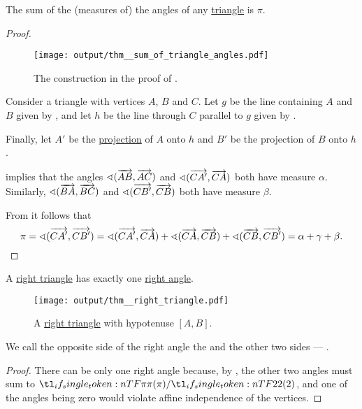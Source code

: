 \begin{proposition}\label{thm:sum_of_triangle_angles}
  The sum of the (measures of) the angles of any \hyperref[def:triangle]{triangle} is \( \pi \).
\end{proposition}
\begin{proof}
  \begin{figure}[!ht]
    \centering
    \texttt{[image: output/thm\_\_sum\_of\_triangle\_angles.pdf]}
    \caption{The construction in the proof of .}\label{fig:thm:sum_of_triangle_angles}
  \end{figure}

  Consider a triangle with vertices \( A \), \( B \) and \( C \). Let \( g \) be the line containing \( A \) and \( B \) given by , and let \( h \) be the line through \( C \) parallel to \( g \) given by .

  Finally, let \( A' \) be the \hyperref[def:rigid_motion/projection]{projection} of \( A \) onto \( h \) and \( B' \) be the projection of \( B \) onto \( h \).

   implies that the angles \( \sphericalangle(\overrightarrow{AB}, \overrightarrow{AC}) \) and \( \sphericalangle(\overrightarrow{CA'}, \overrightarrow{CA}) \) both have measure \( \alpha \). Similarly, \( \sphericalangle(\overrightarrow{BA}, \overrightarrow{BC}) \) and \( \sphericalangle(\overrightarrow{CB'}, \overrightarrow{CB}) \) both have measure \( \beta \).

  From  it follows that
  \begin{equation*}
    \pi
    =
    \sphericalangle(\overrightarrow{CA'}, \overrightarrow{CB'})
    =
    \sphericalangle(\overrightarrow{CA'}, \overrightarrow{CA}) + \sphericalangle(\overrightarrow{CA}, \overrightarrow{CB}) + \sphericalangle(\overrightarrow{CB}, \overrightarrow{CB'})
    =
    \alpha + \gamma + \beta.
  \end{equation*}
\end{proof}

\begin{corollary}\label{thm:right_triangle}
  A \hyperref[def:triangle/right]{right triangle} has exactly one \hyperref[def:angle/measure/right]{right angle}.

  \begin{figure}[!ht]
    \centering
    \texttt{[image: output/thm\_\_right\_triangle.pdf]}
    \caption{A \hyperref[def:triangle/right]{right triangle} with hypotenuse \( [A, B] \).}\label{fig:thm:right_triangle}
  \end{figure}

  We call the opposite side of the right angle the  and the other two sides --- .
\end{corollary}
\begin{proof}
  There can be only one right angle because, by , the other two angles must sum to \( \ifrac \pi 2 \), and one of the angles being zero would violate affine independence of the vertices.
\end{proof}

